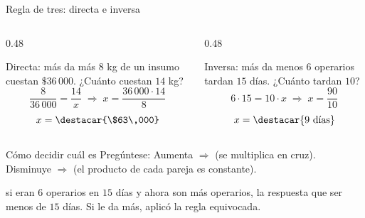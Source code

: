 \documentclass[aspectratio=169,10pt]{beamer}
\begin{document}
\begin{frame}{Regla de tres: directa e inversa}
  \scriptsize
  \begin{columns}[T,onlytextwidth]
    \begin{column}{0.48\textwidth}
      \begin{block}{Directa: más da más}
        \tiny
        $8$ kg de un insumo cuestan $\$36\,000$. ¿Cuánto cuestan $14$ kg?
        \[ \frac{8}{36\,000} = \frac{14}{x}
           \;\Longrightarrow\; x = \frac{36\,000\cdot 14}{8} \]
        \[ x = \destacar{\$63\,000} \]
      \end{block}
    \end{column}
    \begin{column}{0.48\textwidth}
      \begin{alertblock}{Inversa: más da menos}
        \tiny
        $6$ operarios tardan $15$ días. ¿Cuánto tardan $10$?
        \[ 6\cdot 15 = 10\cdot x \;\Longrightarrow\;
           x = \frac{90}{10} \]
        \[ x = \destacar{9\ \text{días}} \]
      \end{alertblock}
    \end{column}
  \end{columns}

  \vspace{0.12cm}
  \begin{block}{Cómo decidir cuál es}
    \tiny
    Pregúntese:  Aumenta $\Rightarrow$  (se multiplica en cruz).
    Disminuye $\Rightarrow$  (el producto de cada pareja es
    constante).
  \end{block}

  \vspace{0.06cm}
  {\tiny\color{uniGris}  si eran $6$
  operarios en $15$ días y ahora son más operarios, la respuesta 
  que ser menos de $15$ días. Si le da más, aplicó la regla equivocada.}
\end{frame}
\end{document}
